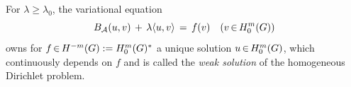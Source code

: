 \documentclass[11pt,twoside]{article}
\begin{document}
\begin{theorem}\label{DIRICHLET_EXISTENCE_UNIQUENESS_THEOREM}
For $\lambda \geq \lambda_0$, the variational equation
\[
B_{{\mathcal{A}}}(u,v) \,+\, \lambda \langle u,v \rangle
\,=\, f(v) \quad (v {\,\in\,} H_0^{m}(G))
\]
owns for $f {\,\in\,} H^{-m}(G) := H_0^{m}(G)^*$
a unique solution $u {\,\in\,} H_0^{m}(G)$,
which continuously depends on $f$ and is called
the \textit{weak solution} of the homogeneous Dirichlet problem.
\end{theorem}

\end{document}
